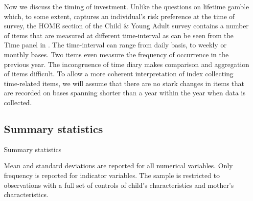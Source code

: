 \documentclass[]{article}
\begin{document}
Now we discuss the timing of investment. Unlike the questions on lifetime gamble which, to some extent, captures an individual's risk preference at the time of survey, the HOME section of the Child \& Young Adult survey contains a number of items that are measured at different time-interval as can be seen from the Time panel in . The time-interval can range from daily basis, to weekly or monthly bases. Two items even measure the frequency of occurrence in the previous year. The incongruence of time diary makes comparison and aggregation of items difficult. To allow a more coherent interpretation of index collecting time-related items, we will assume that there are no stark changes in items that are recorded on bases spanning shorter than a year within the year when data is collected.


\subsection{Summary statistics}

\begin{table}[!b]\centering \caption{Summary statistics \label{table:summary}}
	\setlength{\extrarowheight}{0.3em}
	\begin{threeparttable}
		
	\begin{tablenotes}[flushleft]\footnotesize
		\item Mean and standard deviations are reported for all numerical variables. Only frequency is reported for indicator variables. The sample is restricted to observations with a full set of controls of child's characteristics and mother's characteristics.
	\end{tablenotes}
	\end{threeparttable}
\end{table}
\end{document}

